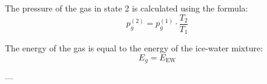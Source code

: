 The pressure of the gas in state 2 is calculated using the formula:  
\[
p_g^{(2)} = p_g^{(1)} \cdot \frac{T_2}{T_1}
\]  

The energy of the gas is equal to the energy of the ice-water mixture:  
\[
E_g = E_{\text{EW}}
\]  

---